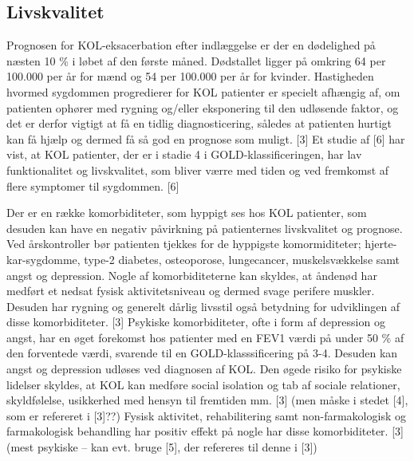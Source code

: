 \subsection{Livskvalitet}
Prognosen for KOL-eksacerbation efter indlæggelse er der en dødelighed på næsten 10 \% i løbet af den første måned. Dødstallet ligger på omkring 64 per 100.000 per år for mænd og 54 per 100.000 per år for kvinder.
Hastigheden hvormed sygdommen progredierer for KOL patienter er specielt afhængig af, om patienten ophører med rygning og/eller eksponering til den udløsende faktor, og det er derfor vigtigt at få en tidlig diagnosticering, således at patienten hurtigt kan få hjælp og dermed få så god en prognose som muligt. [3]
Et studie af [6] har vist, at KOL patienter, der er i stadie 4 i GOLD-klassificeringen, har lav funktionalitet og livskvalitet, som bliver værre med tiden og ved fremkomst af flere symptomer til sygdommen. [6]

Der er en række komorbiditeter, som hyppigt ses hos KOL patienter, som desuden kan have en negativ påvirkning på patienternes livskvalitet og prognose. Ved årskontroller bør patienten tjekkes for de hyppigste komormiditeter; hjerte-kar-sygdomme, type-2 diabetes, osteoporose, lungecancer, muskelsvækkelse samt angst og depression.
Nogle af komorbiditeterne kan skyldes, at åndenød har medført et nedsat fysisk aktivitetsniveau og dermed svage perifere muskler. Desuden har rygning og generelt dårlig livsstil også betydning for udviklingen af disse komorbiditeter. [3]
Psykiske komorbiditeter, ofte i form af depression og angst, har en øget forekomst hos patienter med en FEV1 værdi på under 50 \% af den forventede værdi, svarende til en GOLD-klasssificering på 3-4. Desuden kan angst og depression udløses ved diagnosen af KOL. Den øgede risiko for psykiske lidelser skyldes, at KOL kan medføre social isolation og tab af sociale relationer, skyldfølelse, usikkerhed med hensyn til fremtiden mm. [3] (men måske i stedet [4], som er refereret i [3]??)
Fysisk aktivitet, rehabilitering samt non-farmakologisk og farmakologisk behandling har positiv effekt på nogle har disse komorbiditeter. [3] (mest psykiske – kan evt. bruge [5], der refereres til denne i [3])
